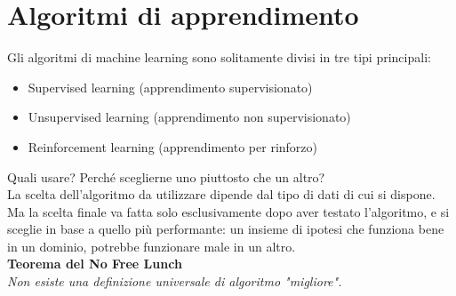 \documentclass[a4paper,12pt,oneside]{book}
\begin{document}
\chapter{Algoritmi di apprendimento}
Gli algoritmi di machine learning sono solitamente divisi in tre tipi principali:
\begin{itemize}
\item Supervised learning (apprendimento supervisionato)
\item Unsupervised learning (apprendimento non supervisionato)
\item Reinforcement learning (apprendimento per rinforzo)
\end{itemize}
Quali usare? Perch\'{e} sceglierne uno piuttosto che un altro?\\
La scelta dell'algoritmo da utilizzare dipende dal tipo di dati di cui si dispone. Ma la scelta finale va fatta solo esclusivamente dopo aver testato l'algoritmo, e si sceglie in base a quello pi\`{u} performante: un insieme di ipotesi che funziona bene in un dominio, potrebbe funzionare male in un altro.\\
\textbf{Teorema del No Free Lunch \cite[Wolper,1996]{NFL}}\\
\textit{Non esiste una definizione universale di algoritmo "migliore".}
\end{document}
